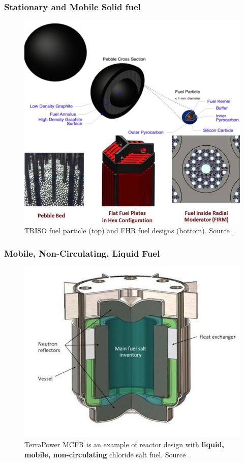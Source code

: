 \begin{frame}
  \frametitle{Stationary and Mobile Solid fuel}
               \begin{figure}[t]
                \vspace*{-0.11in}
			\hspace*{-0.35in}
                \includegraphics[height=0.63\textwidth]{./images/solid_fuel.jpg}
                \caption{TRISO fuel particle (top) and FHR fuel designs (bottom). Source \cite{forsberg_basis_2016-1}.}
             \end{figure}   
  
\end{frame}

\begin{frame}
  \frametitle{Mobile, Non-Circulating, Liquid Fuel}
               \begin{figure}[t]
                \vspace*{-0.1in}
			\hspace*{-0.35in}
                \includegraphics[height=0.6\textwidth]{./images/mcfr-crossection.jpg}
                \caption{TerraPower MCFR is an example of reactor design with \textbf{liquid, mobile, non-circulating} chloride salt fuel. Source \cite{doene_southern_2018}.}
             \end{figure}   
  
\end{frame}

